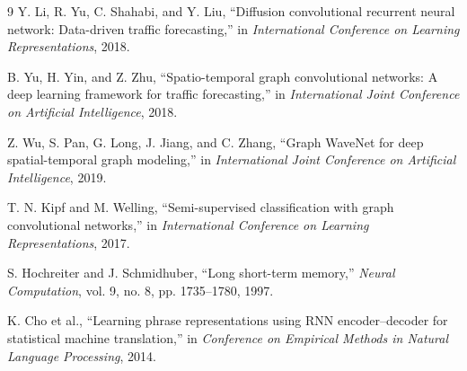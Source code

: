 \documentclass[11pt]{article}
\begin{document}
\begin{thebibliography}{9}
Y. Li, R. Yu, C. Shahabi, and Y. Liu, ``Diffusion convolutional recurrent neural network: Data-driven traffic forecasting,'' in \emph{International Conference on Learning Representations}, 2018.

B. Yu, H. Yin, and Z. Zhu, ``Spatio-temporal graph convolutional networks: A deep learning framework for traffic forecasting,'' in \emph{International Joint Conference on Artificial Intelligence}, 2018.

Z. Wu, S. Pan, G. Long, J. Jiang, and C. Zhang, ``Graph WaveNet for deep spatial-temporal graph modeling,'' in \emph{International Joint Conference on Artificial Intelligence}, 2019.

T. N. Kipf and M. Welling, ``Semi-supervised classification with graph convolutional networks,'' in \emph{International Conference on Learning Representations}, 2017.

S. Hochreiter and J. Schmidhuber, ``Long short-term memory,'' \emph{Neural Computation}, vol. 9, no. 8, pp. 1735--1780, 1997.

K. Cho et al., ``Learning phrase representations using RNN encoder--decoder for statistical machine translation,'' in \emph{Conference on Empirical Methods in Natural Language Processing}, 2014.
\end{thebibliography}
\end{document}
